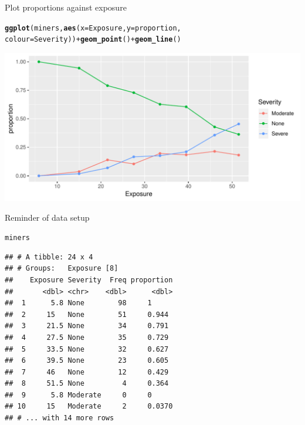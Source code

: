 \documentclass[unknownkeysallowed]{beamer}\usepackage[]{graphicx}\usepackage[]{color}
\makeatletter
\def\maxwidth{ %
  \ifdim\Gin@nat@width>\linewidth
    \linewidth
  \else
    \Gin@nat@width
  \fi
}
\newcommand{\hlopt}[1]{\textcolor[rgb]{0,0,0}{#1}}%
\newcommand{\hlstd}[1]{\textcolor[rgb]{0.345,0.345,0.345}{#1}}%
\newcommand{\hlkwc}[1]{\textcolor[rgb]{0.333,0.667,0.333}{#1}}%
\newcommand{\hlkwd}[1]{\textcolor[rgb]{0.737,0.353,0.396}{\textbf{#1}}}%
\newenvironment{kframe}{%
 \def\at@end@of@kframe{}%
 \ifinner\ifhmode%
  \def\at@end@of@kframe{\end{minipage}}%
  \begin{minipage}{\columnwidth}%
 \fi\fi%
 \def\FrameCommand##1{\hskip\@totalleftmargin \hskip-\fboxsep
 \colorbox{shadecolor}{##1}\hskip-\fboxsep
     \hskip-\linewidth \hskip-\@totalleftmargin \hskip\columnwidth}%
 \MakeFramed {\advance\hsize-\width
   \@totalleftmargin\z@ \linewidth\hsize
   \@setminipage}}%
 {\par\unskip\endMakeFramed%
 \at@end@of@kframe}
\newenvironment{knitrout}{}{} %
\makeatother
\begin{document}
\begin{frame}[fragile]{Plot proportions against exposure}
  
\begin{knitrout}\small
{}\color{fgcolor}\begin{kframe}
\begin{alltt}
\hlkwd{ggplot}\hlstd{(miners,}\hlkwd{aes}\hlstd{(}\hlkwc{x}\hlstd{=Exposure,}\hlkwc{y}\hlstd{=proportion,}
                  \hlkwc{colour}\hlstd{=Severity))}\hlopt{+}\hlkwd{geom_point}\hlstd{()}\hlopt{+}\hlkwd{geom_line}\hlstd{()}
\end{alltt}
\end{kframe}
\includegraphics[width=\maxwidth]{figure/unnamed-chunk-80-1} 

\end{knitrout}
  
\end{frame}

\begin{frame}[fragile]{Reminder of data setup}

  \begin{footnotesize}
\begin{knitrout}
\color{fgcolor}\begin{kframe}
\begin{alltt}
\hlstd{miners}
\end{alltt}
\begin{verbatim}
## # A tibble: 24 x 4
## # Groups:   Exposure [8]
##    Exposure Severity  Freq proportion
##       <dbl> <chr>    <dbl>      <dbl>
##  1      5.8 None        98     1     
##  2     15   None        51     0.944 
##  3     21.5 None        34     0.791 
##  4     27.5 None        35     0.729 
##  5     33.5 None        32     0.627 
##  6     39.5 None        23     0.605 
##  7     46   None        12     0.429 
##  8     51.5 None         4     0.364 
##  9      5.8 Moderate     0     0     
## 10     15   Moderate     2     0.0370
## # ... with 14 more rows
\end{verbatim}
\end{kframe}
\end{knitrout}
  \end{footnotesize}
\end{frame}
\end{document}
